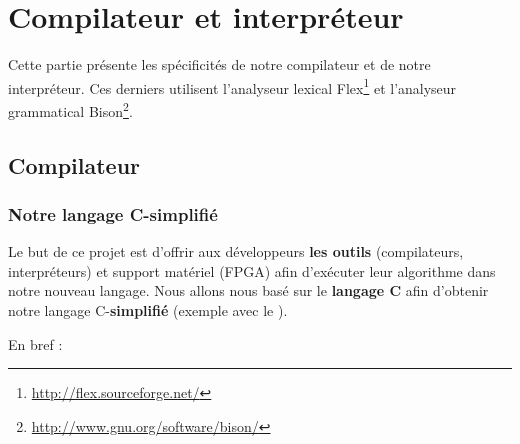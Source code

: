 
\section{Compilateur et interpréteur}

    Cette partie présente les spécificités de notre compilateur et de notre interpréteur. Ces derniers utilisent l'analyseur lexical Flex\footnote{\url{http://flex.sourceforge.net/}} et l'analyseur grammatical Bison\footnote{\url{http://www.gnu.org/software/bison/}}.

    \subsection{Compilateur}

    \subsubsection{Notre langage C-simplifié}

    Le but de ce projet est d'offrir aux développeurs \textbf{les outils} (compilateurs, interpréteurs) et support matériel (FPGA) afin d'exécuter leur algorithme dans notre nouveau langage. Nous allons nous basé sur le \textbf{langage C} afin d'obtenir notre langage C-\textbf{simplifié} (exemple avec le ). 

En bref :

